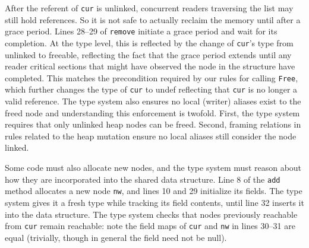 After the referent of \texttt{cur} is unlinked, concurrent readers traversing the list may still hold references.  So it is not safe to actually reclaim the memory until after a grace period.
Lines 28--29 of \lstinline|remove| initiate a grace period and wait for its completion.  At the type level, this is reflected by the change of \lstinline|cur|'s type from \textsf{unlinked} to \textsf{freeable}, reflecting the fact that the grace period extends until any reader critical sections that might have observed the node in the structure have completed.
This matches the precondition required by our rules for calling \lstinline|Free|, which further changes the type of \lstinline|cur| to \textsf{undef} reflecting that \lstinline|cur| is no longer a valid reference. The type system also ensures no local (writer) aliases exist to the freed node and understanding this enforcement is twofold. First, the type system requires that only \textsf{unlinked} heap nodes can be freed. Second, framing relations in rules related to the heap mutation ensure no local aliases still consider the node linked.

Some code must also allocate new nodes, and the type system must reason about how they are incorporated into the shared data structure.
Line 8 of the \texttt{add} method allocates a new node \texttt{nw}, and lines 10 and 29 initialize its fields.
The type system gives it a \textsf{fresh} type while tracking its field contents, until line 32 inserts it into the data structure.  The type system checks that nodes previously reachable from \lstinline|cur| remain reachable: note the field maps of \lstinline|cur| and \texttt{nw} in lines 30--31 are equal (trivially, though in general the field need not be  null).
